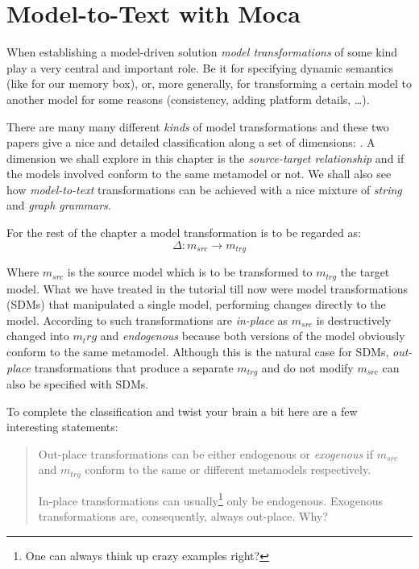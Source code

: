 \chapter{Model-to-Text with Moca}

When establishing a model-driven solution \emph{model transformations} of some kind play a very central and important role.
Be it for specifying dynamic semantics (like for our memory box), or, more generally, for transforming a certain model to another model for some reasons (consistency, adding platform details, \ldots).  

There are many many different \emph{kinds} of model transformations and these two papers give a nice and detailed classification along a set of dimensions: \cite{CH03,Mens_Gorp_2006}. 
A dimension we shall explore in this chapter is the \emph{source-target relationship} and if the models involved conform to the same metamodel or not.
We shall also see how \emph{model-to-text} transformations can be achieved with a nice mixture of \emph{string} and \emph{graph grammars}. 

For the rest of the chapter a model transformation is to be regarded as:
\begin{displaymath}
 	\Delta: m_{src} \rightarrow m_{trg}
\end{displaymath}

Where $m_{src}$ is the source model which is to be transformed to $m_{trg}$ the target model.
What we have treated in the tutorial till now were model transformations (SDMs) that manipulated a single model, performing changes directly to the model.
According to \cite{Mens_Gorp_2006} such transformations are \emph{in-place} as $m_{src}$ is destructively changed into $m_trg$ and \emph{endogenous} because both versions of the model obviously conform to the same metamodel.
Although this is the natural case for SDMs, \emph{out-place} transformations that produce a separate $m_{trg}$ and do not modify $m_{src}$ can also be specified with SDMs.

\clearpage
To complete the classification and twist your brain a bit here are a few interesting statements:
\begin{quote}
Out-place transformations can be either endogenous or \emph{exogenous} if $m_{src}$ and $m_{trg}$ conform to the same or different metamodels respectively.

In-place transformations can usually\footnote{One can always think up crazy examples right?} only be endogenous.  Exogenous transformations are, consequently, always out-place.  Why? 
\end{quote}  
  

